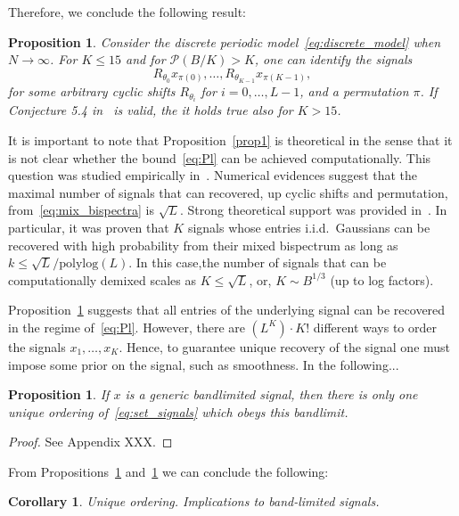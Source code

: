 \documentclass[english,12pt]{article}
\newcommand{\TODO}[1]{{\color{red}{[#1]}}}
\numberwithin{equation}{section}
\numberwithin{mytheorem}{section} %
\newtheorem{conj}[mytheorem]{Conjecture}
\newtheorem{cor}[mytheorem]{Corollary}
\newtheorem{prop}[mytheorem]{Proposition}
\begin{document}
Therefore, we conclude the following result:
\begin{prop} \label{prop1}
Consider the  discrete periodic model~\eqref{eq:discrete_model} when $N\to\infty$. 
For $K\leq 15$ and for $\mathcal{P}(B/K)>K$, one can identify the signals 
\begin{equation} \label{eq:set_signals}
R_{\theta_0}x_{\pi(0)}, \ldots,R_{\theta_{K-1}}x_{\pi(K-1)},
\end{equation}
for some arbitrary cyclic shifts $R_{\theta_i}$ for $i=0,\ldots,L-1$, and a permutation $\pi$.
If Conjecture 5.4 in~\cite{bandeira2017estimation} is valid, the it holds true also for $K>15$.
\end{prop}	

It is important to note that Proposition~\eqref{prop1} is theoretical in the sense that it is not clear whether the bound~\eqref{eq:Pl} can be achieved computationally.  
This question was studied empirically in~\cite{boumal2018heterogeneous}. Numerical evidences suggest that the maximal number of signals that can recovered, up cyclic shifts and permutation, from~\eqref{eq:mix_bispectra} is $\sqrt{L}$. 
Strong theoretical support was provided in~\cite{weinthesis}. In particular,  it was proven that $K$ signals whose entries i.i.d.\ Gaussians can be recovered with high probability from their mixed bispectrum as long as $k\leq \sqrt{L}/\text{polylog}(L)$.
In this case,the number of signals that can be computationally 
demixed scales as $K\leq \sqrt{L}$, or, $K\sim B^{1/3}$ (up to log factors).  



Proposition~\ref{prop1} suggests that all entries of the underlying signal can be recovered in the regime of~\eqref{eq:Pl}. However, there are $(L^K)\cdot K!$ \TODO{check this number}  different ways to order the signals $x_1,\ldots,x_K$. Hence, to guarantee unique recovery of the signal one must impose some prior on the signal, such as smoothness. In the following... 

\begin{prop} \label{prop:bandlimit}
If $x$ is a generic bandlimited signal, then there is only one unique ordering of~\eqref{eq:set_signals} which obeys this bandlimit. 
\end{prop}	
\begin{proof}
	See Appendix XXX.
\end{proof}

	From Propositions~\ref{prop1} and~\ref{prop:bandlimit} we can conclude the following:
\begin{cor}
Unique ordering. Implications to band-limited signals.
\end{cor}
\end{document}
